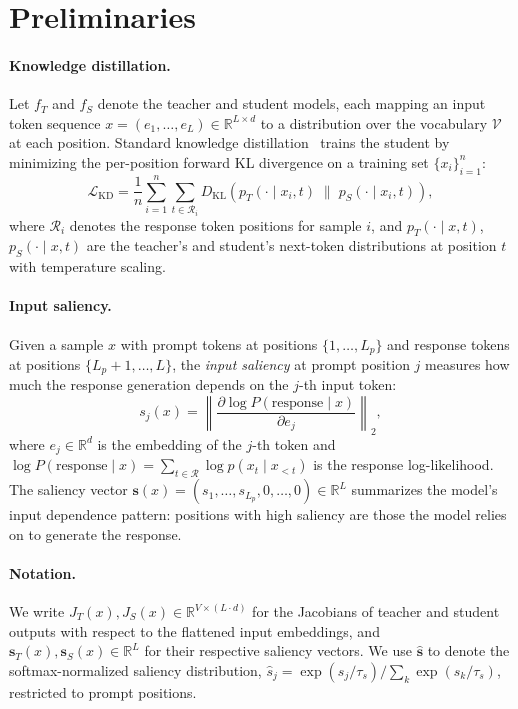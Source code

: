 
\section{Preliminaries}

\paragraph{Knowledge distillation.}
Let $f_T$ and $f_S$ denote the teacher and student models, each mapping an input token sequence $x = (e_1, \ldots, e_L) \in \mathbb{R}^{L \times d}$ to a distribution over the vocabulary $\mathcal{V}$ at each position.
Standard knowledge distillation~\citep{hinton2015distilling} trains the student by minimizing the per-position forward KL divergence on a training set $\{x_i\}_{i=1}^n$:
\begin{equation}\label{eq:standard-kd}
\mathcal{L}_\mathrm{KD} = \frac{1}{n} \sum_{i=1}^{n} \sum_{t \in \mathcal{R}_i} D_\mathrm{KL}\!\left( p_T(\cdot \mid x_i, t) \;\big\|\; p_S(\cdot \mid x_i, t) \right),
\end{equation}
where $\mathcal{R}_i$ denotes the response token positions for sample $i$, and $p_T(\cdot \mid x, t)$, $p_S(\cdot \mid x, t)$ are the teacher's and student's next-token distributions at position $t$ with temperature scaling.

\paragraph{Input saliency.}
Given a sample $x$ with prompt tokens at positions $\{1, \ldots, L_p\}$ and response tokens at positions $\{L_p\!+\!1, \ldots, L\}$, the \emph{input saliency} at prompt position $j$ measures how much the response generation depends on the $j$-th input token:
\begin{equation}\label{eq:saliency-def}
s_j(x) = \left\| \frac{\partial \log P(\text{response} \mid x)}{\partial e_j} \right\|_2,
\end{equation}
where $e_j \in \mathbb{R}^d$ is the embedding of the $j$-th token and $\log P(\text{response} \mid x) = \sum_{t \in \mathcal{R}} \log p(x_t \mid x_{<t})$ is the response log-likelihood.
The saliency vector $\mathbf{s}(x) = (s_1, \ldots, s_{L_p}, 0, \ldots, 0) \in \mathbb{R}^L$ summarizes the model's input dependence pattern: positions with high saliency are those the model relies on to generate the response.

\paragraph{Notation.}
We write $J_T(x), J_S(x) \in \mathbb{R}^{V \times (L \cdot d)}$ for the Jacobians of teacher and student outputs with respect to the flattened input embeddings, and $\mathbf{s}_T(x), \mathbf{s}_S(x) \in \mathbb{R}^L$ for their respective saliency vectors. We use $\hat{\mathbf{s}}$ to denote the softmax-normalized saliency distribution, $\hat{s}_j = \exp(s_j / \tau_s) / \sum_k \exp(s_k / \tau_s)$, restricted to prompt positions.

